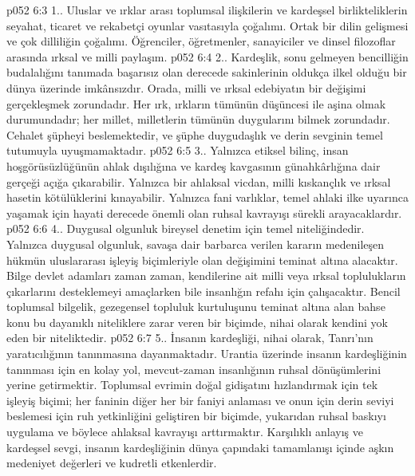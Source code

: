 \vs p052 6:3 1.\bibnobreakspace {}. Uluslar ve ırklar arası toplumsal ilişkilerin ve kardeşsel birlikteliklerin seyahat, ticaret ve rekabetçi oyunlar vasıtasıyla çoğalımı. Ortak bir dilin gelişmesi ve çok dilliliğin çoğalımı. Öğrenciler, öğretmenler, sanayiciler ve dinsel filozoflar arasında ırksal ve milli paylaşım.
\vs p052 6:4 2.\bibnobreakspace {}. Kardeşlik, sonu gelmeyen bencilliğin budalalığını tanımada başarısız olan derecede sakinlerinin oldukça ilkel olduğu bir dünya üzerinde imkânsızdır. Orada, milli ve ırksal edebiyatın bir değişimi gerçekleşmek zorundadır. Her ırk, ırkların tümünün düşüncesi ile aşina olmak durumundadır; her millet, milletlerin tümünün duygularını bilmek zorundadır. Cehalet şüpheyi beslemektedir, ve şüphe duygudaşlık ve derin sevginin temel tutumuyla uyuşmamaktadır.
\vs p052 6:5 3.\bibnobreakspace {}. Yalnızca etiksel bilinç, insan hoşgörüsüzlüğünün ahlak dışılığına ve kardeş kavgasının günahkârlığına dair gerçeği açığa çıkarabilir. Yalnızca bir ahlaksal vicdan, milli kıskançlık ve ırksal hasetin kötülüklerini kınayabilir. Yalnızca fani varlıklar, temel ahlaki ilke uyarınca yaşamak için hayati derecede önemli olan ruhsal kavrayışı sürekli arayacaklardır.
\vs p052 6:6 4.\bibnobreakspace {}. Duygusal olgunluk bireysel denetim için temel niteliğindedir. Yalnızca duygusal olgunluk, savaşa dair barbarca verilen kararın medenileşen hükmün uluslararası işleyiş biçimleriyle olan değişimini teminat altına alacaktır. Bilge devlet adamları zaman zaman, kendilerine ait milli veya ırksal toplulukların çıkarlarını desteklemeyi amaçlarken bile insanlığın refahı için çalışacaktır. Bencil toplumsal bilgelik, gezegensel topluluk kurtuluşunu teminat altına alan bahse konu bu dayanıklı niteliklere zarar veren bir biçimde, nihai olarak kendini yok eden bir niteliktedir.
\vs p052 6:7 5.\bibnobreakspace {}. İnsanın kardeşliği, nihai olarak, Tanrı’nın yaratıcılığının tanınmasına dayanmaktadır. Urantia üzerinde insanın kardeşliğinin tanınması için en kolay yol, mevcut\hyp{}zaman insanlığının ruhsal dönüşümlerini yerine getirmektir. Toplumsal evrimin doğal gidişatını hızlandırmak için tek işleyiş biçimi; her faninin diğer her bir faniyi anlaması ve onun için derin seviyi beslemesi için ruh yetkinliğini geliştiren bir biçimde, yukarıdan ruhsal baskıyı uygulama ve böylece ahlaksal kavrayışı arttırmaktır. Karşılıklı anlayış ve kardeşsel sevgi, insanın kardeşliğinin dünya çapındaki tamamlanışı içinde aşkın medeniyet değerleri ve kudretli etkenlerdir.
